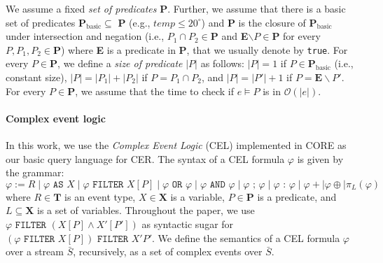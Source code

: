 We assume a fixed \textit{set of predicates} \textbf{P}. 
Further, we assume that there is a basic set of predicates \textbf{P}$_\text{basic} \subseteq$ \textbf{P} (e.g., $temp \leq 20^\circ$) and \textbf{P} is the closure of \textbf{P}$_\text{basic}$ under intersection and negation (i.e., $P_1\cap P_2 \in \textbf{P}$ and \textbf{E}$\backslash P \in \textbf{P}$ for every $P, P_1, P_2 \in \textbf{P}$) where \textbf{E} is a predicate in \textbf{P}, that we usually denote by \texttt{true}.
For every $P \in \textbf{P}$, we define a \textit{size of predicate} $|P|$ as follows:
$|P|=1$ if $P\in \textbf{P}_\text{basic}$ (i.e., constant size), $|P|=|P_1|+|P_2|$ if $P=P_1\cap P_2$, and $|P|=|P'|+1$ if $P=\textbf{E}\backslash P'$. 
For every $P\in\textbf{P}$, we assume that the time to check if $e\vDash P$ is in $\mathcal{O}(|e|)$.

\paragraph{Complex event logic}
In this work, we use the \textit{Complex Event Logic} (CEL) implemented in CORE as our basic query language for CER. The syntax of a CEL formula $\varphi$ is given by the grammar:
$$\varphi:= R \mid \varphi \texttt{ AS } X \mid 
\varphi \texttt{ FILTER } X[P] \mid 
\varphi \texttt{ OR } \varphi \mid 
\varphi \texttt{ AND } \varphi \mid 
\varphi \text{ ; } \varphi \mid 
\varphi \text{ : } \varphi \mid 
\varphi+ \mid \varphi \oplus \mid \pi_L(\varphi)$$
where $R\in\textbf{T}$ is an event type, $X\in\textbf{X}$ is a variable, $P\in\textbf{P}$ is a predicate, and $L\subseteq \textbf{X}$ is a set of variables. 
Throughout the paper, we use $\varphi \texttt{ FILTER } (X[P] \wedge X'[P'])$ as syntactic sugar for $(\varphi \texttt{ FILTER } X[P])\texttt{ FILTER } X'P'$.
We define the semantics of a CEL formula $\varphi$ over a stream $\bar{S}$, recursively, as a set of complex events over $\bar{S}$.

